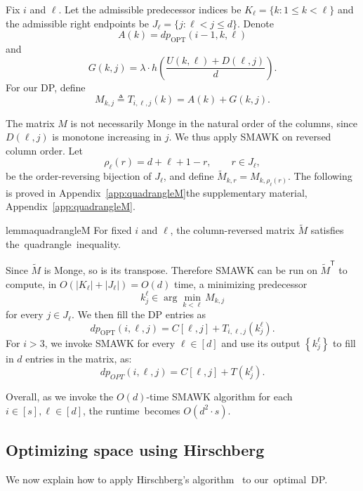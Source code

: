 \documentclass[11pt,letterpaper]{article}
\newcommand{\set}[1]{\left\{#1\right\}}
\newcommand{\appendixlocation}[1]{\ifarxiv Appendix~\ref{#1}\else the supplementary material, Appendix~\ref{#1}\fi}
\begin{document}
{%
    Fix $i$ and $\ell$. Let the admissible predecessor indices be
$K_\ell=\{k:1\le k<\ell\}$ and the admissible right endpoints be
$J_\ell=\{j:\ell<j\le d\}$. Denote
\[
A(k)=dp_{\mathrm{OPT}}(i-1,k,\ell)
\]
and
\[
G(k,j)=\lambda\cdot h\!\left(\frac{U(k,\ell)+D(\ell,j)}{d}\right).
\]
For our DP, define
\[
M_{k,j}\triangleq T_{i,\ell,j}(k)=A(k)+G(k,j).
\]

The matrix $M$ is not necessarily Monge in the natural order of the
columns, since $D(\ell,j)$ is monotone increasing in $j$. We thus
apply SMAWK on reversed column order. Let
\[
\rho_\ell(r)=d+\ell+1-r,\qquad r\in J_\ell,
\]
be the order-reversing bijection of $J_\ell$, and define
$
\widetilde M_{k,r}=M_{k,\rho_\ell(r)} .
$
The following is proved in \appendixlocation{app:quadrangleM}.

\begin{restatable}{lemma}{quadrangleM}\label{lem:quadrangleM}
For fixed $i$ and $\ell$, the column-reversed matrix
$\widetilde M$ satisfies \mbox{the quadrangle inequality.}
\end{restatable}



Since $\widetilde M$ is Monge, so is its transpose. Therefore SMAWK
can be run on $\widetilde M^{\mathsf T}$ to compute, in
$O(|K_\ell|+|J_\ell|)=O(d)$ time, a minimizing predecessor
\[
k^\ell_j \in \arg\min_{k<\ell} M_{k,j}
\]
for every $j\in J_\ell$. We then fill the DP entries as
\[
dp_{\mathrm{OPT}}(i,\ell,j)
=
C[\ell,j]+T_{i,\ell,j}(k^\ell_j).
\]
For $i>3$, we invoke SMAWK for every $\ell\in[d]$ and use its output $\set{k_j^\ell}$ to fill in $d$ entries in the matrix, as:
{
$$
dp_{OPT}(i,\ell,j) = C[\ell,j] + T(k_j^\ell).
$$
}


Overall, as we invoke the $O(d)$-time SMAWK algorithm for each $i\in[s],\ell\in[d]$, the \mbox{runtime becomes} $O(d^2\cdot s)$.

\subsection{Optimizing space using Hirschberg}\label{sec:hirschberg}
We now explain how to apply Hirschberg's algorithm~\citeyearpar{hirschberg1975linear} to \mbox{our optimal DP.}

}
\end{document}
